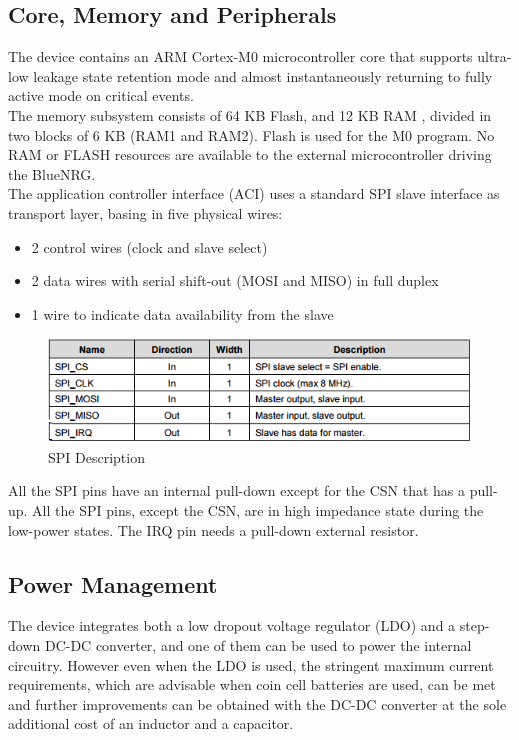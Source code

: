 \subsection{Core, Memory and Peripherals}
The device contains an ARM Cortex-M0 microcontroller core that supports ultra-low leakage state retention mode and almost instantaneously returning to fully active mode on critical events. \\
The memory subsystem consists of 64 KB Flash, and 12 KB RAM , divided in two blocks of 6 KB (RAM1 and RAM2). Flash is used for the M0 program. No RAM or FLASH resources are available to the external microcontroller driving the BlueNRG.\\
The application controller interface (ACI) uses a standard SPI slave interface as transport layer, basing in five physical wires:
\begin{itemize}
	\item 2 control wires (clock and slave select) 
	\item 2 data wires with serial shift-out (MOSI and MISO) in full duplex 
	\item 1 wire to indicate data availability from the slave
\end{itemize}
\begin{figure}[ht]
	\centering
	\includegraphics[scale=0.5]{images/spi_table.png}
	\caption{SPI Description}
\end{figure}
All the SPI pins have an internal pull-down except for the CSN that has a pull-up. All the SPI pins, except the CSN, are in high impedance state during the low-power states. The IRQ pin needs a pull-down external resistor.\\
\subsection{Power Management}
The device integrates both a low dropout voltage regulator (LDO) and a step-down DC-DC converter, and one of them can be used to power the internal circuitry. However even when the LDO is used, the stringent maximum current requirements, which are advisable when coin cell batteries are used, can be met and further improvements can be obtained with the DC-DC converter at the sole additional cost of an inductor and a capacitor.
